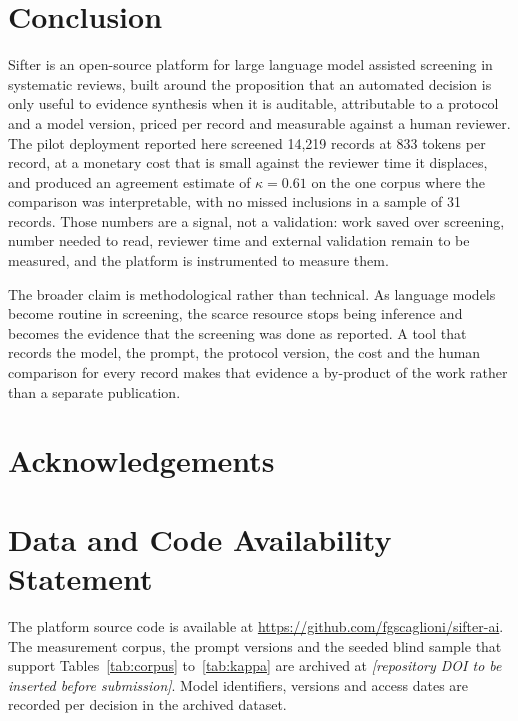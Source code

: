 \section{Conclusion}\label{sec:conclusion}

Sifter is an open-source platform for large language model assisted screening
in systematic reviews, built around the proposition that an automated decision
is only useful to evidence synthesis when it is auditable, attributable to a
protocol and a model version, priced per record and measurable against a human
reviewer. The pilot deployment reported here screened 14{,}219 records at 833
tokens per record, at a monetary cost that is small against the reviewer time it
displaces, and produced an agreement estimate of
$\kappa = 0.61$ on the one corpus where the comparison was interpretable, with
no missed inclusions in a sample of 31 records. Those numbers are a signal, not
a validation: work saved over screening, number needed to read, reviewer time
and external validation remain to be measured, and the platform is instrumented
to measure them.

The broader claim is methodological rather than technical. As language models
become routine in screening, the scarce resource stops being inference and
becomes the evidence that the screening was done as reported. A tool that
records the model, the prompt, the protocol version, the cost and the human
comparison for every record makes that evidence a by-product of the work rather
than a separate publication.

\section*{Acknowledgements}


\section*{Data and Code Availability Statement}

The platform source code is available at \url{https://github.com/fgscaglioni/sifter-ai}.
The measurement corpus, the prompt versions and the seeded blind sample that
support Tables~\ref{tab:corpus} to~\ref{tab:kappa} are archived at
\emph{[repository DOI to be inserted before submission]}.
Model identifiers, versions and access dates are recorded per decision in the
archived dataset.

